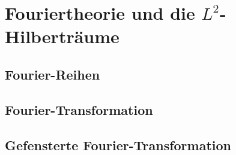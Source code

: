 %
%
%
\chapter{Fouriertheorie und die $L^2$-Hilberträume
\label{chapter:fourier}}




\section{Fourier-Reihen}



\section{Fourier-Transformation}



\section{Gefensterte Fourier-Transformation}


